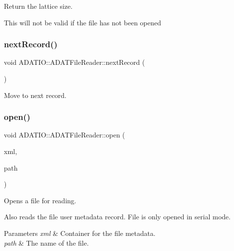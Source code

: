 Return the lattice size. 

This will not be valid if the file has not been opened \mbox{\label{classADATIO_1_1ADATFileReader_ga032651053fa6b2de6d3977f15862c48e}} 
\subsubsection{\texorpdfstring{nextRecord()}{nextRecord()}}
{\footnotesize\ttfamily void A\+D\+A\+T\+I\+O\+::\+A\+D\+A\+T\+File\+Reader\+::next\+Record (\begin{DoxyParamCaption}{ }\end{DoxyParamCaption})\hspace{0.3cm}{\ttfamily [protected]}}



Move to next record. 

\mbox{\label{classADATIO_1_1ADATFileReader_ga2b2ac967129dfd2d61a79e36034b400f}} 
\subsubsection{\texorpdfstring{open()}{open()}}
{\footnotesize\ttfamily void A\+D\+A\+T\+I\+O\+::\+A\+D\+A\+T\+File\+Reader\+::open (\begin{DoxyParamCaption}\item[{\mbox{\hyperlink{classADATXML_1_1XMLReader}{X\+M\+L\+Reader}} \&}]{xml,  }\item[{const std\+::string \&}]{path }\end{DoxyParamCaption})}



Opens a file for reading. 

Also reads the file user metadata record. File is only opened in serial mode. 
\begin{DoxyParams}{Parameters}
{\em xml} & Container for the file metadata. \\
\hline
{\em path} & The name of the file. \\
\hline
\end{DoxyParams}
\mbox{\label{classADATIO_1_1ADATFileReader_gac92ce1b0fee7c00b8a7dc988f3d4906e}} 
